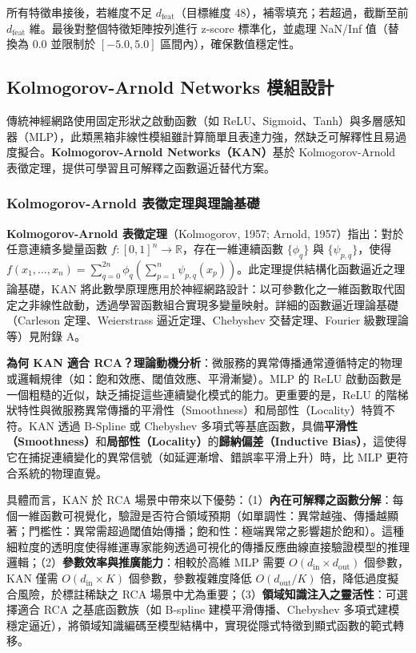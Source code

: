 \documentclass[10pt,a4paper,twocolumn]{article}
\begin{document}
所有特徵串接後，若維度不足 $d_{\text{feat}}$（目標維度 48），補零填充；若超過，截斷至前 $d_{\text{feat}}$ 維。最後對整個特徵矩陣按列進行 z-score 標準化，並處理 NaN/Inf 值（替換為 0.0 並限制於 $[-5.0, 5.0]$ 區間內），確保數值穩定性。

\subsection{Kolmogorov-Arnold Networks 模組設計}

傳統神經網路使用固定形狀之啟動函數（如 ReLU、Sigmoid、Tanh）與多層感知器（MLP），此類黑箱非線性模組雖計算簡單且表達力強，然缺乏可解釋性且易過度擬合。\textbf{Kolmogorov-Arnold Networks（KAN）}基於 Kolmogorov-Arnold 表徵定理，提供可學習且可解釋之函數逼近替代方案。

\subsubsection{Kolmogorov-Arnold 表徵定理與理論基礎}

\textbf{Kolmogorov-Arnold 表徵定理}（Kolmogorov, 1957; Arnold, 1957）指出：對於任意連續多變量函數 $f: [0,1]^n \to \mathbb{R}$，存在一維連續函數 $\{\phi_q\}$ 與 $\{\psi_{p,q}\}$，使得 $f(x_1, \ldots, x_n) = \sum_{q=0}^{2n} \phi_q\left( \sum_{p=1}^{n} \psi_{p,q}(x_p) \right)$。此定理提供結構化函數逼近之理論基礎，KAN 將此數學原理應用於神經網路設計：以可參數化之一維函數取代固定之非線性啟動，透過學習函數組合實現多變量映射。詳細的函數逼近理論基礎（Carleson 定理、Weierstrass 逼近定理、Chebyshev 交替定理、Fourier 級數理論等）見附錄 A。

\textbf{為何 KAN 適合 RCA？理論動機分析}：微服務的異常傳播通常遵循特定的物理或邏輯規律（如：飽和效應、閾值效應、平滑漸變）。MLP 的 ReLU 啟動函數是一個粗糙的近似，缺乏捕捉這些連續變化模式的能力。更重要的是，ReLU 的階梯狀特性與微服務異常傳播的平滑性（Smoothness）和局部性（Locality）特質不符。KAN 透過 B-Spline 或 Chebyshev 多項式等基底函數，具備\textbf{平滑性（Smoothness）}和\textbf{局部性（Locality）}的\textbf{歸納偏差（Inductive Bias）}，這使得它在捕捉連續變化的異常信號（如延遲漸增、錯誤率平滑上升）時，比 MLP 更符合系統的物理直覺。

具體而言，KAN 於 RCA 場景中帶來以下優勢：（1）\textbf{內在可解釋之函數分解}：每個一維函數可視覺化，驗證是否符合領域預期（如單調性：異常越強、傳播越顯著；門檻性：異常需超過閾值始傳播；飽和性：極端異常之影響趨於飽和）。這種細粒度的透明度使得維運專家能夠透過可視化的傳播反應曲線直接驗證模型的推理邏輯；（2）\textbf{參數效率與推廣能力}：相較於高維 MLP 需要 $O(d_{\text{in}} \times d_{\text{out}})$ 個參數，KAN 僅需 $O(d_{\text{in}} \times K)$ 個參數，參數複雜度降低 $O(d_{\text{out}}/K)$ 倍，降低過度擬合風險，於標註稀缺之 RCA 場景中尤為重要；（3）\textbf{領域知識注入之靈活性}：可選擇適合 RCA 之基底函數族（如 B-spline 建模平滑傳播、Chebyshev 多項式建模穩定逼近），將領域知識編碼至模型結構中，實現從隱式特徵到顯式函數的範式轉移。
\end{document}
